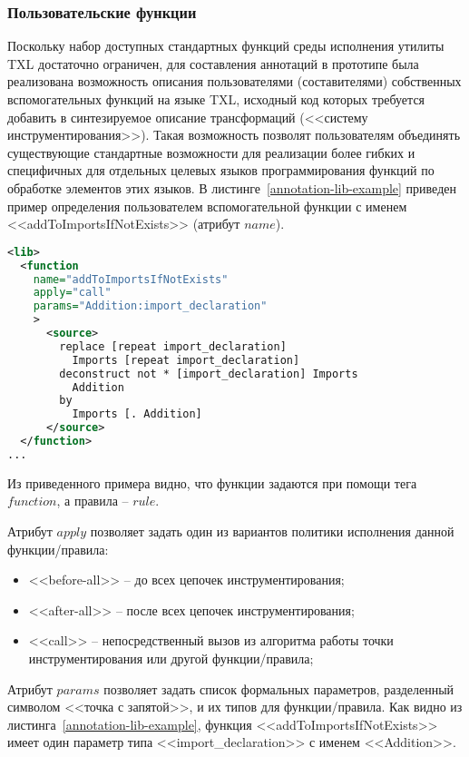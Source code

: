 \subsubsection{Пользовательские функции}

Поскольку набор доступных стандартных функций среды исполнения утилиты TXL достаточно ограничен, для составления аннотаций в прототипе была реализована возможность описания пользователями (составителями) собственных вспомогательных функций на языке TXL, исходный код которых требуется добавить в синтезируемое описание трансформаций (<<систему инструментирования>>).
Такая возможность позволят пользователям объединять существующие стандартные возможности для реализации более гибких и специфичных для отдельных целевых языков программирования функций по обработке элементов этих языков.
В листинге~\ref{annotation-lib-example} приведен пример определения пользователем вспомогательной функции с именем <<addToImportsIfNotExists>> (атрибут $name$).

\begin{lstlisting}[frame=single, language=XML, label={annotation-lib-example}, caption={Пример описания вспомогательной функции.}]
<lib>
  <function
    name="addToImportsIfNotExists"
    apply="call"
    params="Addition:import_declaration"
    >
      <source>
        replace [repeat import_declaration]
          Imports [repeat import_declaration]
        deconstruct not * [import_declaration] Imports
          Addition
        by
          Imports [. Addition]
      </source>
  </function>
...
\end{lstlisting}

Из приведенного примера видно, что функции задаются при помощи тега $function$, а правила -- $rule$.

Атрибут $apply$ позволяет задать один из вариантов политики исполнения данной функции/правила:
\begin{itemize}[noitemsep]
  \item <<before-all>>  -- до всех цепочек инструментирования;
  \item <<after-all>>   -- после всех цепочек инструментирования;
  \item <<call>>        -- непосредственный вызов из алгоритма работы точки инструментирования или другой функции/правила;
\end{itemize}

Атрибут $params$ позволяет задать список формальных параметров, разделенный символом <<точка с запятой>>, и их типов для функции/правила.
Как видно из листинга~\ref{annotation-lib-example}, функция <<addToImportsIfNotExists>> имеет один параметр типа <<import\_declaration>> с именем <<Addition>>.

